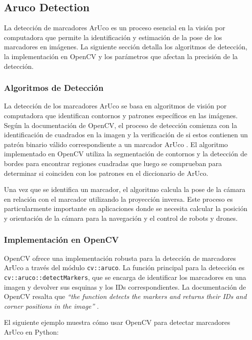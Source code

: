 \subsection{Aruco Detection}
    La detección de marcadores ArUco es un proceso esencial en la visión por computadora que permite la identificación y estimación de la pose de los marcadores en imágenes. La siguiente sección detalla los algoritmos de detección, la implementación en OpenCV y los parámetros que afectan la precisión de la detección.

    \subsubsection{Algoritmos de Detección}

    La detección de los marcadores ArUco se basa en algoritmos de visión por computadora que identifican contornos y patrones específicos en las imágenes. Según la documentación de OpenCV, el proceso de detección comienza con la identificación de cuadrados en la imagen y la verificación de si estos contienen un patrón binario válido correspondiente a un marcador ArUco \cite{opencv_docs_aruco}. El algoritmo implementado en OpenCV utiliza la segmentación de contornos y la detección de bordes para encontrar regiones cuadradas que luego se comprueban para determinar si coinciden con los patrones en el diccionario de ArUco.

    Una vez que se identifica un marcador, el algoritmo calcula la pose de la cámara en relación con el marcador utilizando la proyección inversa. Este proceso es particularmente importante en aplicaciones donde se necesita calcular la posición y orientación de la cámara para la navegación y el control de robots y drones.

    \subsubsection{Implementación en OpenCV}

    OpenCV ofrece una implementación robusta para la detección de marcadores ArUco a través del módulo \texttt{cv::aruco}. La función principal para la detección es \texttt{cv::aruco::detectMarkers}, que se encarga de identificar los marcadores en una imagen y devolver sus esquinas y los IDs correspondientes. La documentación de OpenCV resalta que \textit{“the function detects the markers and returns their IDs and corner positions in the image”} \cite{opencv_tutorial_aruco}.

    El siguiente ejemplo muestra cómo usar OpenCV para detectar marcadores ArUco en Python:

